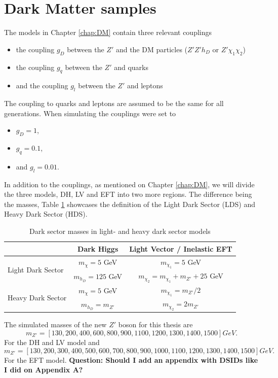 \documentclass[12pt, a4paper]{book}
\begin{document}
\section{Dark Matter samples}\label{chap:DM_sample}
The models in Chapter \ref{chap:DM} contain three relevant couplings
\begin{itemize}
    \item the coupling $g_D$ between the $Z'$ and the DM particles ($Z'Z'h_D$ or $Z'\chi_1\chi_2$)
    \item the coupling $g_q$ between the $Z'$ and quarks
    \item and the coupling $g_l$ between the $Z'$ and leptons
\end{itemize}
The coupling to quarks and leptons are assumed to be the same for all generations. When simulating the couplings were set to
\begin{itemize}
    \item $g_D = 1$,
    \item $g_q=0.1$,
    \item and $g_l=0.01$.
\end{itemize}
In addition to the couplings, as mentioned on Chapter \ref{chap:DM}, we will divide the three models, DH, LV and EFT into two more regions. The difference being the masses, Table \ref{tab:DMass} showcases the definition of the Light Dark Sector (LDS) and Heavy Dark Sector (HDS).
\begin{table}[!h]
    \centering\caption{Dark sector masses in light- and heavy dark sector models}
    \begin{tabular}{l|c|c}\midrule\midrule
                                                                            & Dark Higgs            & Light Vector / Inelastic EFT              \\\midrule
        \multirow{2}{*}[-2\baselineskip]{Light Dark Sector}                 & $m_\chi = 5$ GeV      & $m_{\chi_1}= 5$ GeV                       \\
                                                                            & $m_{h_D} = 125$ GeV   & $m_{\chi_2}= m_{\chi_1}+m_{Z'} + 25$ GeV  \\\midrule
        \multirow{2}{*}[-2\baselineskip]{Heavy Dark Sector}                 & $m_\chi = 5$ GeV      & $m_{\chi_1}= m_{Z'}/2$                    \\
                                                                            & $m_{h_D} = m_{Z'}$    & $m_{\chi_2}= 2m_{Z'}$                     \\\midrule\midrule
    \end{tabular}
    \label{tab:DMass}
\end{table}
\newpage\noindent The simulated masses of the new $Z'$ boson for this thesis are
$$
m_{Z'} = [130, 200, 400, 600, 800, 900, 1100, 1200, 1300, 1400, 1500] GeV.
$$
For the DH and LV model and 
$$
m_{Z'} = [130, 200, 300, 400, 500, 600, 700, 800, 900, 1000, 1100, 1200, 1300, 1400, 1500] GeV.
$$
For the EFT model. \textbf{Question: Should I add an appendix with DSIDs like I did on Appendix A?}
\end{document}

